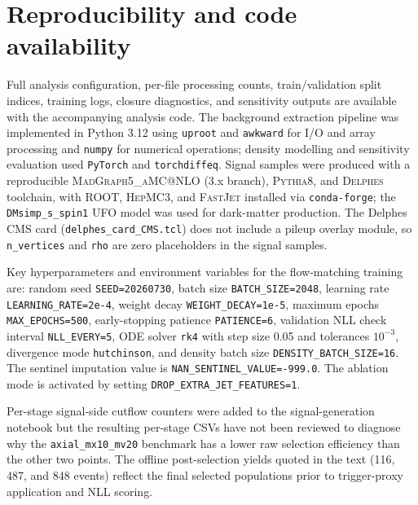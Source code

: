 \documentclass[11pt,a4paper,twocolumn]{article}
\begin{document}
\clearpage
\section{Reproducibility and code availability}
\label{sec:reproducibility}

Full analysis configuration, per-file processing counts, train/validation
split indices, training logs, closure diagnostics, and sensitivity outputs
are available with the accompanying analysis code. The background extraction
pipeline was implemented in Python 3.12 using \texttt{uproot} and
\texttt{awkward} for I/O and array processing and \texttt{numpy} for
numerical operations; density modelling and sensitivity evaluation used
\texttt{PyTorch} and \texttt{torchdiffeq}. Signal samples were produced
with a reproducible \textsc{MadGraph5\_aMC@NLO} (3.x branch),
\textsc{Pythia8}, and \textsc{Delphes} toolchain, with \textsc{ROOT},
\textsc{HepMC3}, and \textsc{FastJet} installed via \texttt{conda-forge};
the \texttt{DMsimp\_s\_spin1} UFO model was used for dark-matter production.
The Delphes CMS card (\texttt{delphes\_card\_CMS.tcl}) does not include a
pileup overlay module, so \texttt{n\_vertices} and \texttt{rho} are zero
placeholders in the signal samples.

Key hyperparameters and environment variables for the flow-matching training
are: random seed \texttt{SEED=20260730}, batch size \texttt{BATCH\_SIZE=2048},
learning rate \texttt{LEARNING\_RATE=2e-4}, weight decay
\texttt{WEIGHT\_DECAY=1e-5}, maximum epochs \texttt{MAX\_EPOCHS=500},
early-stopping patience \texttt{PATIENCE=6}, validation NLL check interval
\texttt{NLL\_EVERY=5}, ODE solver \texttt{rk4} with step size 0.05 and
tolerances $10^{-3}$, divergence mode \texttt{hutchinson}, and density
batch size \texttt{DENSITY\_BATCH\_SIZE=16}. The sentinel imputation value
is \texttt{NAN\_SENTINEL\_VALUE=-999.0}. The ablation mode is activated by
setting \texttt{DROP\_EXTRA\_JET\_FEATURES=1}.

Per-stage signal-side cutflow counters were added to the signal-generation
notebook but the resulting per-stage CSVs have not been reviewed to diagnose
why the \texttt{axial\_mx10\_mv20} benchmark has a lower raw selection
efficiency than the other two points. The offline post-selection yields
quoted in the text (116, 487, and 848 events) reflect the final selected
populations prior to trigger-proxy application and NLL scoring.

\clearpage
\nocite{*}


\end{document}
